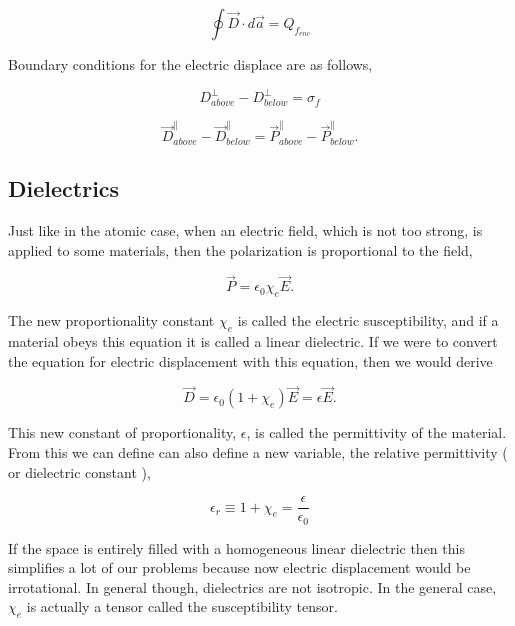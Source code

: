 \documentclass[preprint, review,12pt]{elsarticle}
\def\.{\cdot}
\begin{document}
\begin{equation}
    \oint \vec{D} \. d\vec{a}= Q_{f_{enc}}
\end{equation}

Boundary conditions for the electric displace are as follows,

\begin{equation}
    D_{above}^\bot - D_{below}^\bot = \sigma_f
\end{equation}

\begin{equation}
    \vec{D}_{above}^\parallel - \vec{D}_{below}^\parallel = \vec{P}_{above}^\parallel - \vec{P}_{below}^\parallel.
\end{equation}

\subsection{Dielectrics}

Just like in the atomic case, when an electric field, which is not too strong, is applied to some materials, then the polarization is proportional to the field,

\begin{equation}
    \vec{P} = \epsilon_0 \chi_e \vec{E}.
\end{equation}

The new proportionality constant $\chi_e$ is called the electric susceptibility, and if a material obeys this equation it is called a linear dielectric. If we were to convert the equation for electric displacement with this equation, then we would derive 

\begin{equation}
    \vec{D} = \epsilon_0 (1+\chi_e)\vec{E} = \epsilon \vec{E}.
\end{equation}

This new constant of proportionality, $\epsilon$, is called the permittivity of the material. From this we can define can also define a new variable, the relative permittivity ( or dielectric constant ), 

\begin{equation}
    \epsilon_r \equiv 1 + \chi_e = \frac{\epsilon}{\epsilon_0}
\end{equation}

If the space is entirely filled with a homogeneous linear dielectric then this simplifies a lot of our problems because now electric displacement would be irrotational. In general though, dielectrics are not isotropic. In the general case, $\chi_e$ is actually a tensor called the susceptibility tensor. 
\end{document}
